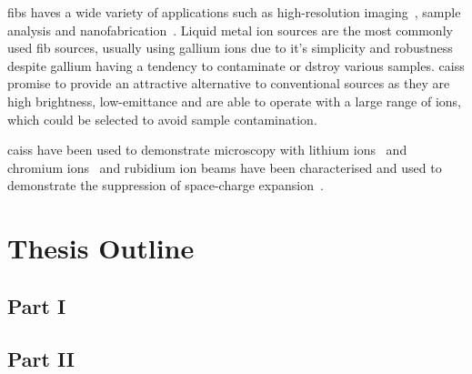 \Glspl{fib} haves a wide variety of applications such as high-resolution imaging~\cite{scipioni_helium_2008}, sample analysis and nanofabrication~\cite{khizroev_focused-ion-beam-based_2004}.
Liquid metal ion sources are the most commonly used \gls{fib} sources, usually using gallium ions due to it's simplicity and robustness despite gallium having a tendency to contaminate or dstroy various samples.
\Glspl{cais} promise to provide an attractive alternative to conventional sources as they are high brightness, low-emittance and are able to operate with a large range of ions, which could be selected to avoid sample contamination.

\Glspl{cais} have been used to demonstrate microscopy with lithium ions~\cite{knuffman_nanoscale_2011} and chromium ions~\cite{steele_focused_2010} and rubidium ion beams have been characterised and used to demonstrate the suppression of space-charge expansion~\cite{murphy_detailed_2014,thompson_suppression_2016}.

\section{Thesis Outline}

\subsection{Part I}

\subsection{Part II}
